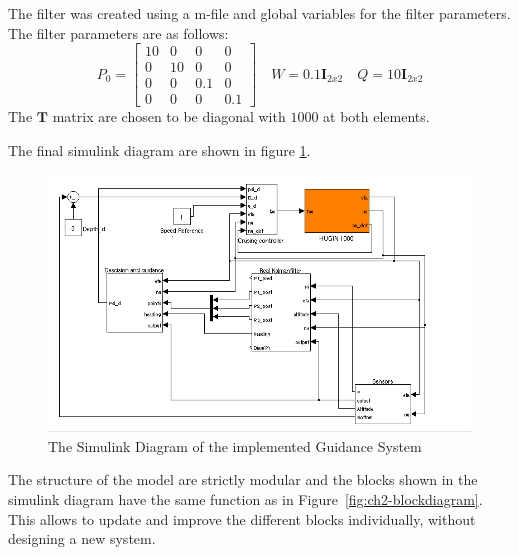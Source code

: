 	The filter was created using a m-file and global variables for the filter parameters. The filter
	parameters are as follows:
	\begin{equation*}
		P_0 = \left [ \begin{matrix}
				10 & 0 & 0 & 0 \\
				0 & 10 & 0 & 0 \\
				0 & 0 & 0.1 & 0 \\
				0 & 0 & 0 & 0.1
				\end{matrix} \right] \quad
		W = 0.1 \mathbf{I}_{2x2} \quad Q = 10 \mathbf{I}_{2x2} 
	\end{equation*}
	The $\mathbf{T}$ matrix are chosen to be diagonal with $1000$ at both elements.

	The final simulink diagram are shown in figure \ref{fig:ch3_simulink}.
	\begin{figure}[htbp]
		\centering
		\includegraphics[width=\textwidth]{pics/simulink}
		\caption{The Simulink Diagram of the implemented Guidance System}
		\label{fig:ch3_simulink}
	\end{figure}
	The structure of the model are strictly modular and the blocks shown in the simulink diagram have the
	same function as in Figure~\ref{fig:ch2-blockdiagram}. This allows to update and improve the different
	blocks individually, without designing a new system.

	

